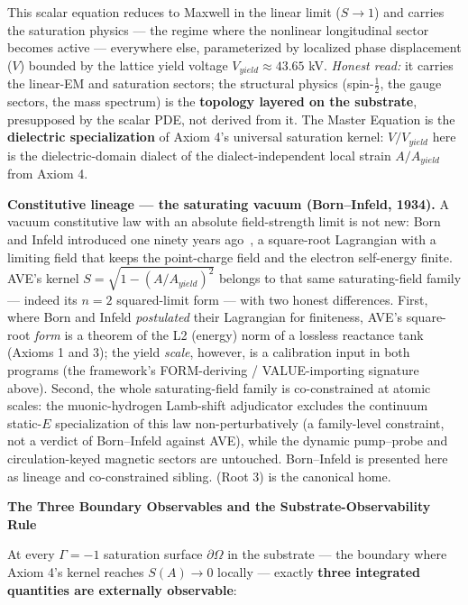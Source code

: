 \noindent This scalar equation reduces to Maxwell in the linear limit ($S \to 1$) and carries the saturation physics --- the regime where the nonlinear longitudinal sector becomes active --- everywhere else, parameterized by localized phase displacement ($V$) bounded by the lattice yield voltage $V_{yield} \approx 43.65$ kV. \emph{Honest read:} it carries the linear-EM and saturation sectors; the structural physics (spin-$\tfrac12$, the gauge sectors, the mass spectrum) is the \textbf{topology layered on the substrate}, presupposed by the scalar PDE, not derived from it. The Master Equation is the \textbf{dielectric specialization} of Axiom 4's universal saturation kernel: $V/V_{yield}$ here is the dielectric-domain dialect of the dialect-independent local strain $A/A_{yield}$ from Axiom 4.

\vspace{0.5em}
\noindent \textbf{Constitutive lineage --- the saturating vacuum (Born--Infeld, 1934).} A vacuum constitutive law with an absolute field-strength limit is not new: Born and Infeld introduced one ninety years ago~\cite{borninfeld1934foundations}, a square-root Lagrangian with a limiting field that keeps the point-charge field and the electron self-energy finite. AVE's kernel $S = \sqrt{1 - (A/A_{yield})^2}$ belongs to that same saturating-field family --- indeed its $n=2$ squared-limit form --- with two honest differences. First, where Born and Infeld \emph{postulated} their Lagrangian for finiteness, AVE's square-root \emph{form} is a theorem of the L2 (energy) norm of a lossless reactance tank (Axioms 1 and 3); the yield \emph{scale}, however, is a calibration input in both programs (the framework's FORM-deriving / VALUE-importing signature above). Second, the whole saturating-field family is co-constrained at atomic scales: the muonic-hydrogen Lamb-shift adjudicator excludes the continuum static-$E$ specialization of this law non-perturbatively (a family-level constraint, not a verdict of Born--Infeld against AVE), while the dynamic pump--probe and circulation-keyed magnetic sectors are untouched. Born--Infeld is presented here as lineage and co-constrained sibling.  (Root 3) is the canonical home.

\vspace{1.5em}
\noindent \textbf{The Three Boundary Observables and the Substrate-Observability Rule}

\noindent At every $\Gamma = -1$\gammaundeclared{} saturation surface $\partial\Omega$ in the substrate --- the boundary where Axiom 4's kernel reaches $S(A) \to 0$ locally --- exactly \textbf{three integrated quantities are externally observable}:

